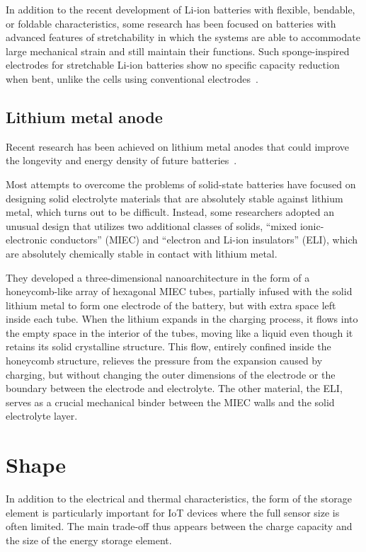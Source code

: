 \documentclass{EPL-master-thesis-covers-EN}
\begin{document}
In addition to the recent development of Li-ion batteries with  flexible, bendable, or foldable characteristics, some research has been focused on batteries with advanced features of stretchability in which the systems are able to accommodate large mechanical strain and still maintain their functions. Such sponge-inspired electrodes for stretchable Li-ion batteries show no specific capacity reduction when bent, unlike the cells using conventional electrodes~\cite{doi:10.1002/adma.201505299}.

\subsection*{Lithium metal anode}

Recent research has been achieved on lithium metal anodes that could improve the longevity and energy density of future batteries~\cite{10.1038/s41586-020-1972-y}.

Most attempts to overcome the problems of solid-state batteries have focused on designing solid electrolyte materials that are absolutely stable against lithium metal, which turns out to be difficult.  Instead, some researchers adopted an unusual design that utilizes two additional classes of solids, ``mixed ionic-electronic conductors'' (MIEC) and “electron and Li-ion insulators” (ELI), which are absolutely chemically stable in contact with lithium metal. 

They developed a three-dimensional nanoarchitecture in the form of a honeycomb-like array of hexagonal MIEC tubes, partially infused with the solid lithium metal to form one electrode of the battery, but with extra space left inside each tube. When the lithium expands in the charging process, it flows into the empty space in the interior of the tubes, moving like a liquid even though it retains its solid crystalline structure. This flow, entirely confined inside the honeycomb structure, relieves the pressure from the expansion caused by charging, but without changing the outer dimensions of the electrode or the boundary between the electrode and electrolyte. The other material, the ELI, serves as a crucial mechanical binder between the MIEC walls and the solid electrolyte layer.

\section{Shape}

In addition to the electrical and thermal characteristics, the form of the storage element is particularly important for IoT devices where the full sensor size is often limited. The main trade-off thus appears between the charge capacity and the size of the energy storage element.
\end{document}
